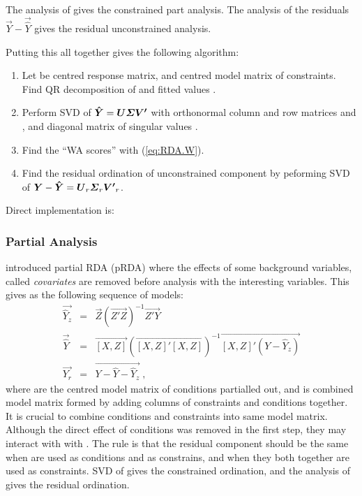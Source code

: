 The analysis of  gives the constrained part analysis. The
analysis of the residuals $\vec{Y} - \vec{\hat Y}$ gives the residual
unconstrained analysis.

Putting this all together gives the following algorithm:
\begin{enumerate}
\item Let  be centred response matrix, and  centred
  model matrix of constraints.  Find QR decomposition of 
  and fitted values .
\item Perform SVD of $\vec{\hat Y} = \vec{U \bSigma V'}$ with
  orthonormal column and row matrices  and , and
  diagonal matrix of singular values \bSigma.
\item Find the ``WA scores''  with (\ref{eq:RDA.W}).
\item Find the residual ordination of unconstrained component by
  peforming SVD of $\vec{Y} - \vec{\hat Y} = \vec{U}_r \bSigma_r \vec{V'}_r$.
\end{enumerate}
Direct implementation is:
\begin{Schunk}
\end{Schunk}

\subsubsection{Partial Analysis}

 introduced partial RDA (pRDA) where the effects of
some background variables, called \emph{covariates} are removed before
analysis with the interesting variables. This gives as the following
sequence of models:
\begin{eqnarray}
  \vec{\hat Y_z} &=& \vec{Z} (\vec{Z' Z})^{-1} \vec{Z' Y} \\
  \vec{\hat Y} &=& \vec{[X,Z]} (\vec{[X,Z]' [X,Z]})^{-1} \vec{[X,Z]' (Y- \hat Y_z)}\\
  \vec{Y_r} &=& \vec{Y - \hat Y - \hat Y_z} \;,
\end{eqnarray}
where  are the centred model matrix of conditions partialled
out, and \vec{[X,Z]} is combined model matrix formed by adding columns
of constraints  and conditions  together. It is crucial
to combine conditions and constraints into same model matrix. Although
the direct effect of conditions was removed in the first step, they
may interact with with . The rule is that the residual
component should be the same when  are used as conditions and
 as constrains, and when they both together are used as
constraints. SVD of  gives the constrained ordination, and
the analysis of  gives the residual ordination.

